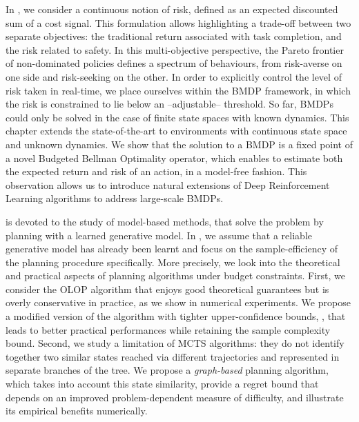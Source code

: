 In \textbf{}, we consider a continuous notion of risk, defined as an expected discounted sum of a cost signal. This formulation allows highlighting  a trade-off between two separate objectives: the traditional return associated with task completion, and the risk related to safety. In this multi-objective perspective, the Pareto frontier of non-dominated policies defines a spectrum of behaviours, from risk-averse on one side and risk-seeking on the other. In order to explicitly control the level of risk taken in real-time, we place ourselves within the \gls{BMDP} framework, in which the risk is constrained to lie below an --adjustable-- threshold. 
So far, \glspl{BMDP} could only be solved in the case of finite state spaces with known dynamics. This chapter extends the state-of-the-art to environments with continuous state space and unknown dynamics. We show that the solution to a \gls{BMDP} is a fixed point of a novel Budgeted Bellman Optimality operator, which enables to estimate both the expected return and risk of an action, in a model-free fashion. This observation allows us to introduce natural extensions of Deep Reinforcement Learning algorithms to address large-scale \glspl{BMDP}.

\textbf{} is devoted to the study of model-based methods, that solve the  problem by planning with a learned generative model.
In \textbf{}, we assume that a reliable generative model has already been learnt and focus on the sample-efficiency of the planning procedure specifically. More precisely, we look into the theoretical and practical aspects of planning algorithms under budget constraints. First, we consider the \gls{OLOP} algorithm that enjoys good theoretical guarantees but is overly conservative in practice, as we show in numerical experiments. We propose a modified version of the algorithm with tighter upper-confidence bounds, \KLOLOP, that leads to better practical performances while retaining the sample complexity bound. Second, we study a limitation of \gls{MCTS} algorithms: they do not identify together two similar states reached via different trajectories and represented in separate branches of the tree. We propose a \emph{graph-based} planning algorithm, which takes into account this state similarity, provide a regret bound that depends on an improved problem-dependent measure of difficulty, and illustrate its empirical benefits numerically.

